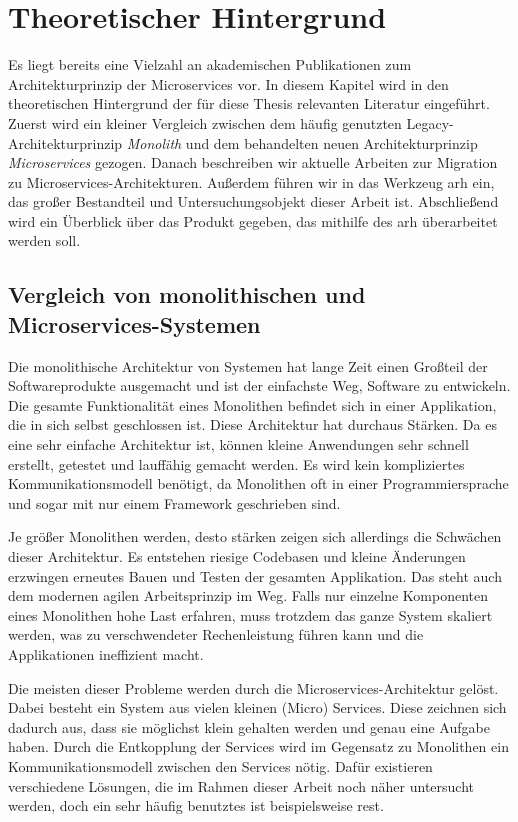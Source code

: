 \chapter{Theoretischer Hintergrund}
\label{chap:theoretischer-hintergrund}

Es liegt bereits eine Vielzahl an akademischen Publikationen zum Architekturprinzip der Microservices vor.
In diesem Kapitel wird in den theoretischen Hintergrund der für diese Thesis relevanten Literatur eingeführt.
Zuerst wird ein kleiner Vergleich zwischen dem häufig genutzten Legacy-Architekturprinzip \emph{Monolith} und dem behandelten neuen Architekturprinzip \emph{Microservices} gezogen.
Danach beschreiben wir aktuelle Arbeiten zur Migration zu Microservices-Architekturen.
Außerdem führen wir in das Werkzeug \gls{arh} ein, das großer Bestandteil und Untersuchungsobjekt dieser Arbeit ist.
Abschließend wird ein Überblick über das Produkt gegeben, das mithilfe des \gls{arh} überarbeitet werden soll.

\section{Vergleich von monolithischen und Microservices-Systemen}

Die monolithische Architektur von Systemen hat lange Zeit einen Großteil der Softwareprodukte ausgemacht und ist der einfachste Weg, Software zu entwickeln.
Die gesamte Funktionalität eines Monolithen befindet sich in einer Applikation, die in sich selbst geschlossen ist. 
Diese Architektur hat durchaus Stärken.
Da es eine sehr einfache Architektur ist, können kleine Anwendungen sehr schnell erstellt, getestet und lauffähig gemacht werden.
Es wird kein kompliziertes Kommunikationsmodell benötigt, da Monolithen oft in einer Programmiersprache und sogar mit nur einem Framework geschrieben sind.

Je größer Monolithen werden, desto stärken zeigen sich allerdings die Schwächen dieser Architektur.
Es entstehen riesige Codebasen und kleine Änderungen erzwingen erneutes Bauen und Testen der gesamten Applikation.
Das steht auch dem modernen agilen Arbeitsprinzip im Weg.
Falls nur einzelne Komponenten eines Monolithen hohe Last erfahren, muss trotzdem das ganze System skaliert werden, was zu verschwendeter Rechenleistung führen kann und die Applikationen ineffizient macht.

Die meisten dieser Probleme werden durch die Microservices-Architektur gelöst.
Dabei besteht ein System aus vielen kleinen (Micro) Services.
Diese zeichnen sich dadurch aus, dass sie möglichst klein gehalten werden und genau eine Aufgabe haben.
Durch die Entkopplung der Services wird im Gegensatz zu Monolithen ein Kommunikationsmodell zwischen den Services nötig.
Dafür existieren verschiedene Lösungen, die im Rahmen dieser Arbeit noch näher untersucht werden, doch ein sehr häufig benutztes ist beispielsweise \gls{rest}.

